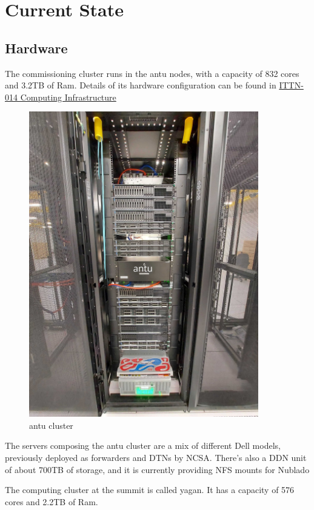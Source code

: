\section{Current State}

\subsection{Hardware}

The commissioning cluster runs in the antu nodes, with a capacity of 832 cores and 3.2TB of Ram. Details of its hardware configuration can be found in \href{https://ittn-014.lsst.io/}{ITTN-014 Computing Infrastructure}

\begin{figure}
    \centering
    \includegraphics[width=10cm]{images/antu.jpg}
    \caption{antu cluster}
\end{figure}

The servers composing the antu cluster are a mix of different Dell models, previously deployed as forwarders and DTNs by NCSA. There's also a DDN unit of about 700TB of storage, and it is currently providing NFS mounts for Nublado
\newpage

The computing cluster at the summit is called yagan. It has a capacity of 576 cores and 2.2TB of Ram. 

